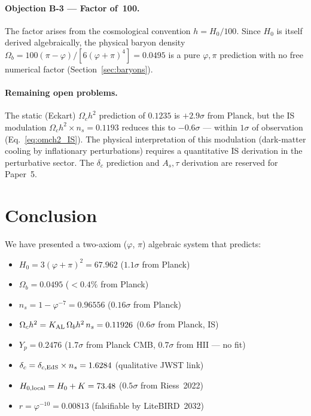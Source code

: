 \documentclass[12pt,a4paper]{article}
\begin{document}
\paragraph{Objection B-3 — Factor of~100.}
The factor arises from the cosmological convention $h = H_0/100$.
Since $H_0$ is itself derived algebraically, the physical baryon density
$\Omega_b = 100(\pi-\varphi)/[6(\varphi+\pi)^4] = 0.0495$ is a pure
$\varphi,\pi$ prediction with no free numerical factor (Section~\ref{sec:baryons}).

\paragraph{Remaining open problems.}
The static (Eckart) $\Omega_c h^2$ prediction of $0.1235$ is $+2.9\sigma$
from Planck, but the IS modulation $\Omega_c h^2 \times n_s = 0.1193$ reduces
this to $-0.6\sigma$ — within $1\sigma$ of observation (Eq.~\ref{eq:omch2_IS}).
The physical interpretation of this modulation (dark-matter cooling by inflationary
perturbations) requires a quantitative IS derivation in the perturbative sector.
The $\delta_c$ prediction and $A_s,\tau$ derivation are reserved for Paper~5.

\section{Conclusion}

We have presented a two-axiom ($\varphi$, $\pi$) algebraic system that predicts:
\begin{itemize}
  \item $H_0 = 3(\varphi+\pi)^2 = 67.962$ ($1.1\sigma$ from Planck)
  \item $\Omega_b = 0.0495$ ($<0.4\%$ from Planck)
  \item $n_s = 1-\varphi^{-7} = 0.96556$ ($0.16\sigma$ from Planck)
  \item $\Omega_c h^2 = K_{\rm AL}\,\Omega_b h^2\,n_s = 0.11926$ ($0.6\sigma$ from Planck, IS)
  \item $Y_p = 0.2476$ ($1.7\sigma$ from Planck CMB, $0.7\sigma$ from HII — no fit)
  \item $\delta_c = \delta_{c,\rm EdS}\times n_s = 1.6284$ (qualitative JWST link)
  \item $H_{0,\rm local} = H_0 + K = 73.48$ ($0.5\sigma$ from Riess~2022)
  \item $r = \varphi^{-10} = 0.00813$ (falsifiable by LiteBIRD~2032)
\end{itemize}
\end{document}
